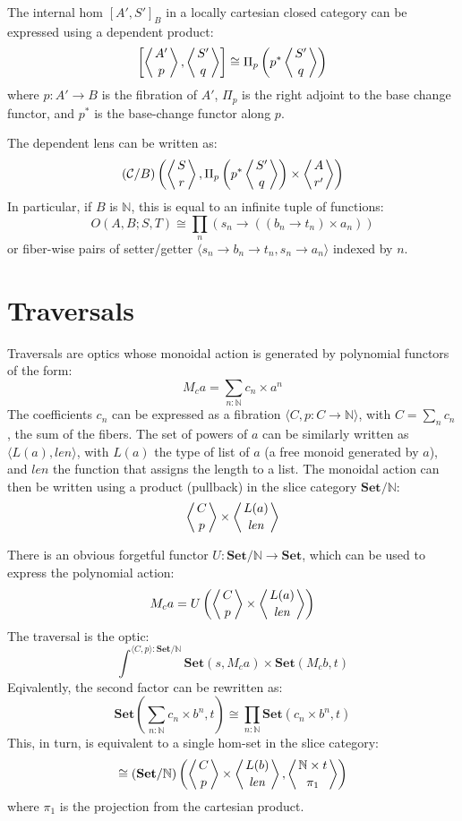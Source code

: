 \documentclass[11pt]{amsart}
\begin{document}
The internal hom $[A', S']_B$ in a locally cartesian closed category can be expressed using a dependent product:
\[ \left [\left \langle A' \atop p \right \rangle, \left \langle S' \atop q \right \rangle \right ] \cong \Pi_p \left(p^* \left \langle S' \atop q \right \rangle \right)\]
where $p \colon A' \to B$ is the fibration of $A'$, $\Pi_p$ is the right adjoint to the base change functor, and $p^*$ is the base-change functor along $p$.

The dependent lens can be written as:
\[ (\mathcal{C} / B) \left( \left \langle S \atop r \right \rangle, \Pi_p \left(p^* \left \langle S' \atop q \right \rangle \right) \times \left \langle A \atop r' \right \rangle \right) \]
In particular, if $B$ is $\mathbb{N}$, this is equal to an infinite tuple of functions:
\[O(A, B; S, T) \cong \prod_n \left( s_n \to \left((b_n \to t_n) \times a_n \right) \right) \]
or fiber-wise pairs of setter/getter $\langle s_n \to b_n \to t_n, s_n \to a_n \rangle$ indexed by $n$.

\section{Traversals}

Traversals are optics whose monoidal action is generated by polynomial functors of the form:
\[ M_{c} a = \sum_{n \colon \mathbb{N}} c_n \times a^n \]
The coefficients $c_n$ can be expressed as a fibration $ \langle C, p \colon C \to \mathbb{N} \rangle$, with $C = \sum_n c_n$, the sum of the fibers. The set of powers of $a$ can be similarly written as $\langle L(a), \mathit{len} \rangle$, with $L(a)$ the type of list of $a$ (a free monoid generated by $a$), and $\mathit{len}$ the function that assigns the length to a list. The monoidal action can then be written using a product (pullback) in the slice category $\mathbf{Set}/\mathbb{N}$:
\[ \left \langle {C \atop p} \right \rangle \times \left \langle {L(a) \atop \mathit{len}} \right \rangle \]

There is an obvious forgetful functor $U \colon \mathbf{Set}/\mathbb{N} \to \mathbf{Set}$, which can be used to express the polynomial action:
\[ M_c a = U\left( 
  \left \langle {C \atop p} \right \rangle \times \left \langle {L(a) \atop \mathit{len}} \right \rangle \right) \]
The traversal is the optic:
\[ \int^{\langle C, p \rangle : \mathbf{Set}/\mathbb{N}} \mathbf{Set} 
\left(s, M_c a \right)  
  \times \mathbf{Set}(M_c b, t) \]
Eqivalently, the second factor can be rewritten as:
\[  \mathbf{Set}\left( \sum_{n \colon \mathbb{N}} c_n \times b^n, t\right) \cong \prod_{n \colon  \mathbb{N}}  \mathbf{Set}(c_n \times b^n, t)\]
This, in turn, is equivalent to a single hom-set in the slice category:
\[ 
 \cong  
(\mathbf{Set}/\mathbb{N})\left(\left \langle {C \atop p} \right \rangle \times \left \langle {L(b) \atop \mathit{len}} \right \rangle, \left \langle {\mathbb{N} \times t \atop \pi_1} \right \rangle \right) \]
where $\pi_1$ is the projection from the cartesian product.
\end{document}
